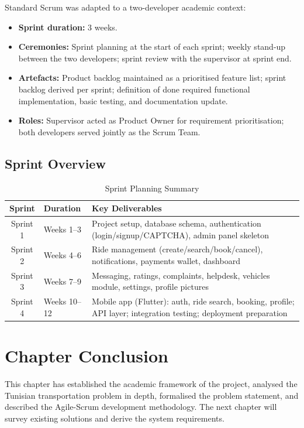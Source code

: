 \documentclass[12pt,a4paper,openright]{report}
\begin{document}
Standard Scrum was adapted to a two-developer academic context:
\begin{itemize}[noitemsep]
    \item \textbf{Sprint duration:} 3 weeks.
    \item \textbf{Ceremonies:} Sprint planning at the start of each sprint; weekly stand-up between the two developers; sprint review with the supervisor at sprint end.
    \item \textbf{Artefacts:} Product backlog maintained as a prioritised feature list; sprint backlog derived per sprint; definition of done required functional implementation, basic testing, and documentation update.
    \item \textbf{Roles:} Supervisor acted as Product Owner for requirement prioritisation; both developers served jointly as the Scrum Team.
\end{itemize}

\subsection{Sprint Overview}

\begin{table}[H]
\centering
\caption{Sprint Planning Summary}
\label{tab:sprints}
\begin{tabularx}{\textwidth}{c l X}
\toprule
\textbf{Sprint} & \textbf{Duration} & \textbf{Key Deliverables} \\
\midrule
Sprint 1 & Weeks 1–3  & Project setup, database schema, authentication (login/signup/CAPTCHA), admin panel skeleton \\
Sprint 2 & Weeks 4–6  & Ride management (create/search/book/cancel), notifications, payments wallet, dashboard \\
Sprint 3 & Weeks 7–9  & Messaging, ratings, complaints, helpdesk, vehicles module, settings, profile pictures \\
Sprint 4 & Weeks 10–12 & Mobile app (Flutter): auth, ride search, booking, profile; API layer; integration testing; deployment preparation \\
\bottomrule
\end{tabularx}
\end{table}

\section*{Chapter Conclusion}

This chapter has established the academic framework of the project, analysed the Tunisian transportation problem in depth, formalised the problem statement, and described the Agile-Scrum development methodology. The next chapter will survey existing solutions and derive the system requirements.
\end{document}
